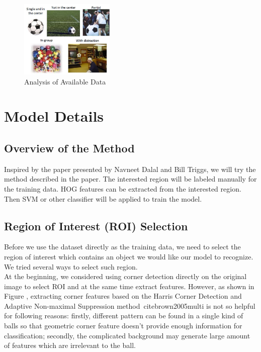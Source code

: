 \documentclass{article}
\begin{document}
\begin{figure}[htp]
\centering
\includegraphics[width=0.4\textwidth]{Analysis_of_Available_Data.jpg}
\caption{Analysis of Available Data}
\label{fig:introduction}
\end{figure}

\section{Model Details} 

\subsection{Overview of the Method}
Inspired by the paper presented\cite{dalal2005histograms} by Navneet Dalal and Bill Triggs, we will try the method described in the paper. The interested region will be labeled manually for the training data. HOG features can be extracted from the interested region. Then SVM or other classifier will be applied to train the model. 

\subsection{Region of Interest (ROI) Selection}
Before we use the dataset directly as the training data, we need to select the region of interest which contains an object we would like our model to recognize. We tried several ways to select such region.\\
At the beginning, we considered using corner detection directly on the original image to select ROI and at the same time extract features. However, as shown in Figure \cite{crd}, extracting corner features based on the Harris Corner Detection and Adaptive Non-maximal Suppression method\ cite{brown2005multi} is not so helpful for following reasons: firstly, different pattern can be found in a single kind of balls so that geometric corner feature doesn't provide enough information for classification; secondly, the complicated background may generate large amount of features which are irrelevant to the ball.\\
\end{document}
